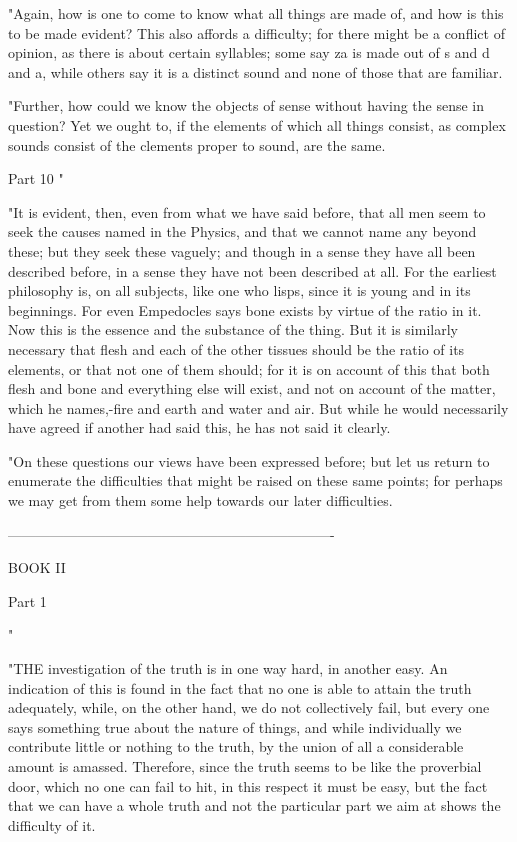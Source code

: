 "Again, how is one to come to know what all things are made of, and
how is this to be made evident? This also affords a difficulty; for
there might be a conflict of opinion, as there is about certain syllables;
some say za is made out of s and d and a, while others say it is a
distinct sound and none of those that are familiar. 

"Further, how could we know the objects of sense without having the
sense in question? Yet we ought to, if the elements of which all things
consist, as complex sounds consist of the clements proper to sound,
are the same. 

Part 10 "

"It is evident, then, even from what we have said before, that all
men seem to seek the causes named in the Physics, and that we cannot
name any beyond these; but they seek these vaguely; and though in
a sense they have all been described before, in a sense they have
not been described at all. For the earliest philosophy is, on all
subjects, like one who lisps, since it is young and in its beginnings.
For even Empedocles says bone exists by virtue of the ratio in it.
Now this is the essence and the substance of the thing. But it is
similarly necessary that flesh and each of the other tissues should
be the ratio of its elements, or that not one of them should; for
it is on account of this that both flesh and bone and everything else
will exist, and not on account of the matter, which he names,-fire
and earth and water and air. But while he would necessarily have agreed
if another had said this, he has not said it clearly. 

"On these questions our views have been expressed before; but let
us return to enumerate the difficulties that might be raised on these
same points; for perhaps we may get from them some help towards our
later difficulties. 

----------------------------------------------------------------------

BOOK II

Part 1 

"

"THE investigation of the truth is in one way hard, in another easy.
An indication of this is found in the fact that no one is able to
attain the truth adequately, while, on the other hand, we do not collectively
fail, but every one says something true about the nature of things,
and while individually we contribute little or nothing to the truth,
by the union of all a considerable amount is amassed. Therefore, since
the truth seems to be like the proverbial door, which no one can fail
to hit, in this respect it must be easy, but the fact that we can
have a whole truth and not the particular part we aim at shows the
difficulty of it. 

